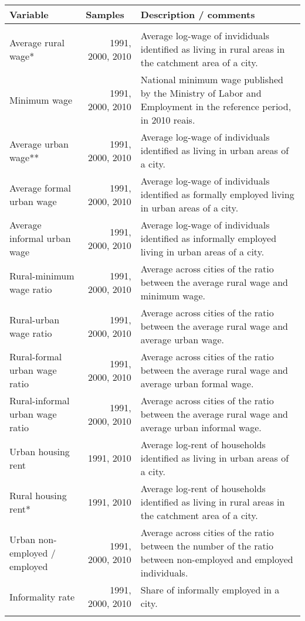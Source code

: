\renewcommand{\arraystretch}{1.2}
    \begin{tabular}{p{14.445em}rp{37.89em}}
    \multicolumn{1}{l}{\textbf{Variable}} & \multicolumn{1}{l}{\textbf{Samples}} & \multicolumn{1}{l}{\textbf{Description / comments}} \\
    \midrule
    \multicolumn{1}{r}{} &       & \multicolumn{1}{r}{} \\
    Average rural wage* & \multicolumn{1}{p{7.055em}}{1991, 2000, 2010} & Average log-wage of invididuals identified as living in rural areas in the catchment area of a city.  \\
    Minimum wage & \multicolumn{1}{p{7.055em}}{1991, 2000, 2010} & National minimum wage published by the Ministry of Labor and Employment in the reference period, in 2010 reais. \\
    Average urban wage** & \multicolumn{1}{p{7.055em}}{1991, 2000, 2010} & Average log-wage of individuals identified as living in urban areas of a city.  \\
    Average formal urban wage & \multicolumn{1}{p{7.055em}}{1991, 2000, 2010} & Average log-wage of individuals identified as formally employed living in urban areas of a city.  \\
    Average informal urban wage & \multicolumn{1}{p{7.055em}}{1991, 2000, 2010} & Average log-wage of individuals identified as informally employed living in urban areas of a city.  \\
    Rural-minimum wage ratio & \multicolumn{1}{p{7.055em}}{1991, 2000, 2010} & Average across cities of the ratio between the average rural wage and minimum wage. \\
    Rural-urban wage ratio & \multicolumn{1}{p{7.055em}}{1991, 2000, 2010} & Average across cities of the ratio between the average rural wage and average urban wage. \\
    Rural-formal urban wage ratio & \multicolumn{1}{p{7.055em}}{1991, 2000, 2010} & Average across cities of the ratio between the average rural wage and average urban formal wage. \\
    Rural-informal urban wage ratio & \multicolumn{1}{p{7.055em}}{1991, 2000, 2010} & Average across cities of the ratio between the average rural wage and average urban informal wage. \\
    Urban housing rent & \multicolumn{1}{p{7.055em}}{1991, 2010} & Average log-rent of households identified as living in urban areas of a city.  \\
    Rural housing rent* & \multicolumn{1}{p{7.055em}}{1991, 2010} & Average log-rent of households identified as living in rural areas in the catchment area of a city.  \\
    Urban non-employed / employed & \multicolumn{1}{p{7.055em}}{1991, 2000, 2010} & Average across cities of the ratio between the number of the ratio between non-employed  and employed individuals. \\
    Informality rate & \multicolumn{1}{p{7.055em}}{1991, 2000, 2010} & Share of informally employed in a city. \\
    \multicolumn{1}{r}{} &       & \multicolumn{1}{r}{} \\


    \bottomrule

    \end{tabular}%

